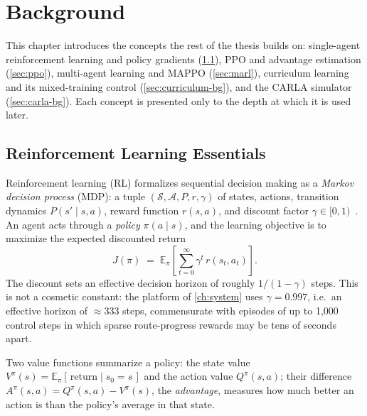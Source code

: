 \chapter{Background}
\label{ch:background}

This chapter introduces the concepts the rest of the thesis builds on:
single-agent reinforcement learning and policy gradients
(\cref{sec:rl-essentials}), PPO and advantage estimation
(\cref{sec:ppo}), multi-agent learning and MAPPO (\cref{sec:marl}),
curriculum learning and its mixed-training control
(\cref{sec:curriculum-bg}), and the CARLA simulator
(\cref{sec:carla-bg}). Each concept is presented only to the depth at
which it is used later.

\section{Reinforcement Learning Essentials}
\label{sec:rl-essentials}

Reinforcement learning (RL) formalizes sequential decision making as a
\emph{Markov decision process} (MDP): a tuple
$(\mathcal{S}, \mathcal{A}, P, r, \gamma)$ of states, actions, transition
dynamics $P(s' \mid s, a)$, reward function $r(s, a)$, and discount
factor $\gamma \in [0, 1)$~\cite{sutton2018rl}. An agent acts through a
\emph{policy} $\pi(a \mid s)$, and the learning objective is to maximize
the expected discounted return
\begin{equation}
  J(\pi) \;=\; \mathbb{E}_{\pi}\!\left[\sum_{t=0}^{\infty} \gamma^{t}\,
  r(s_t, a_t)\right].
\end{equation}
The discount sets an effective decision horizon of roughly
$1/(1-\gamma)$ steps. This is not a cosmetic constant: the platform of
\cref{ch:system} uses $\gamma = 0.997$, i.e.\ an effective horizon of
$\approx 333$ steps, commensurate with episodes of up to 1{,}000 control
steps in which sparse route-progress rewards may be tens of seconds
apart.

Two value functions summarize a policy: the state value
$V^{\pi}(s) = \mathbb{E}_{\pi}[\,\text{return} \mid s_0 = s\,]$ and the
action value $Q^{\pi}(s, a)$; their difference
$A^{\pi}(s, a) = Q^{\pi}(s, a) - V^{\pi}(s)$, the \emph{advantage},
measures how much better an action is than the policy's average in that
state.

